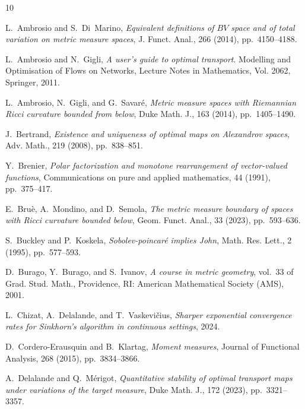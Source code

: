 \documentclass[a4paper,11pt]{article}
\numberwithin{equation}{section}
\theoremstyle{plain}
\theoremstyle{definition}
\theoremstyle{remark}
\begin{document}
\def\cprime{$'$}
\begin{thebibliography}{10}

{\sc L.~Ambrosio and S.~Di~Marino}, {\em Equivalent definitions of {{\(BV\)}}
  space and of total variation on metric measure spaces}, J. Funct. Anal., 266
  (2014), pp.~4150--4188.

{\sc L.~Ambrosio and N.~Gigli}, {\em A user's guide to optimal transport}.
\newblock Modelling and Optimisation of Flows on Networks, Lecture Notes in
  Mathematics, Vol. 2062, Springer, 2011.

{\sc L.~Ambrosio, N.~Gigli, and G.~Savar{\'e}}, {\em Metric measure spaces with
  {Riemannian} {Ricci} curvature bounded from below}, Duke Math. J., 163
  (2014), pp.~1405--1490.

{\sc J.~Bertrand}, {\em Existence and uniqueness of optimal maps on
  {Alexandrov} spaces}, Adv. Math., 219 (2008), pp.~838--851.

{\sc Y.~Brenier}, {\em Polar factorization and monotone rearrangement of
  vector-valued functions}, Communications on pure and applied mathematics, 44
  (1991), pp.~375--417.

{\sc E.~Bru{\`e}, A.~Mondino, and D.~Semola}, {\em The metric measure boundary
  of spaces with {Ricci} curvature bounded below}, Geom. Funct. Anal., 33
  (2023), pp.~593--636.

{\sc S.~Buckley and P.~Koskela}, {\em Sobolev-poincar{\'e} implies {John}},
  Math. Res. Lett., 2 (1995), pp.~577--593.

{\sc D.~Burago, Y.~Burago, and S.~Ivanov}, {\em A course in metric geometry},
  vol.~33 of Grad. Stud. Math., Providence, RI: American Mathematical Society
  (AMS), 2001.

{\sc L.~Chizat, A.~Delalande, and T.~Vaskevičius}, {\em Sharper exponential
  convergence rates for {Sinkhorn}'s algorithm in continuous settings}, 2024.

{\sc D.~Cordero-Erausquin and B.~Klartag}, {\em Moment measures}, Journal of
  Functional Analysis, 268 (2015), pp.~3834--3866.

{\sc A.~Delalande and Q.~M{\'e}rigot}, {\em Quantitative stability of optimal
  transport maps under variations of the target measure}, Duke Math. J., 172
  (2023), pp.~3321--3357.


\end{thebibliography}
\end{document}
